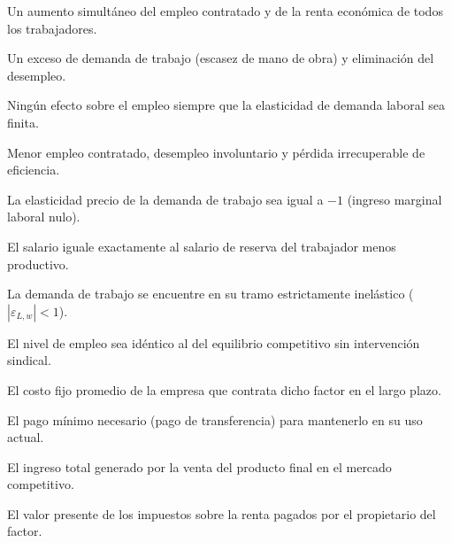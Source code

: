 \begin{opts}
    \item Un aumento simultáneo del empleo contratado y de la renta económica de todos los trabajadores.
    \item Un exceso de demanda de trabajo (escasez de mano de obra) y eliminación del desempleo.
    \item Ningún efecto sobre el empleo siempre que la elasticidad de demanda laboral sea finita.
    \item Menor empleo contratado, desempleo involuntario y pérdida irrecuperable de eficiencia.
\end{opts}

\begin{opts}
    \item La elasticidad precio de la demanda de trabajo sea igual a $-1$ (ingreso marginal laboral nulo).
    \item El salario iguale exactamente al salario de reserva del trabajador menos productivo.
    \item La demanda de trabajo se encuentre en su tramo estrictamente inelástico ($|\varepsilon_{L,w}| < 1$).
    \item El nivel de empleo sea idéntico al del equilibrio competitivo sin intervención sindical.
\end{opts}

\begin{opts}
    \item El costo fijo promedio de la empresa que contrata dicho factor en el largo plazo.
    \item El pago mínimo necesario (pago de transferencia) para mantenerlo en su uso actual.
    \item El ingreso total generado por la venta del producto final en el mercado competitivo.
    \item El valor presente de los impuestos sobre la renta pagados por el propietario del factor.
\end{opts}

